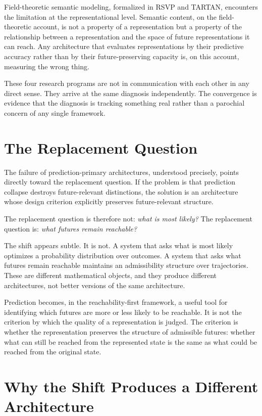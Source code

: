 \documentclass[12pt, oneside]{book}
\theoremstyle{flyxion}
\theoremstyle{definition}
\begin{document}
Field-theoretic semantic modeling, formalized in RSVP and TARTAN,
encounters the limitation at the representational level. Semantic
content, on the field-theoretic account, is not a property of a
representation but a property of the relationship between a
representation and the space of future representations it can reach.
Any architecture that evaluates representations by their predictive
accuracy rather than by their future-preserving capacity is, on this
account, measuring the wrong thing.

These four research programs are not in communication with each other
in any direct sense. They arrive at the same diagnosis independently.
The convergence is evidence that the diagnosis is tracking something
real rather than a parochial concern of any single framework.

\section{The Replacement Question}

The failure of prediction-primary architectures, understood precisely,
points directly toward the replacement question. If the problem is that
prediction collapse destroys future-relevant distinctions, the solution
is an architecture whose design criterion explicitly preserves
future-relevant structure.

The replacement question is therefore not: \emph{what is most likely?}
The replacement question is: \emph{what futures remain reachable?}

The shift appears subtle. It is not. A system that asks what is most
likely optimizes a probability distribution over outcomes. A system that
asks what futures remain reachable maintains an admissibility structure
over trajectories. These are different mathematical objects, and they
produce different architectures, not better versions of the same
architecture.

Prediction becomes, in the reachability-first framework, a useful tool
for identifying which futures are more or less likely to be reachable.
It is not the criterion by which the quality of a representation is
judged. The criterion is whether the representation preserves the
structure of admissible futures: whether what can still be reached from
the represented state is the same as what could be reached from the
original state.

\section{Why the Shift Produces a Different Architecture}
\end{document}
